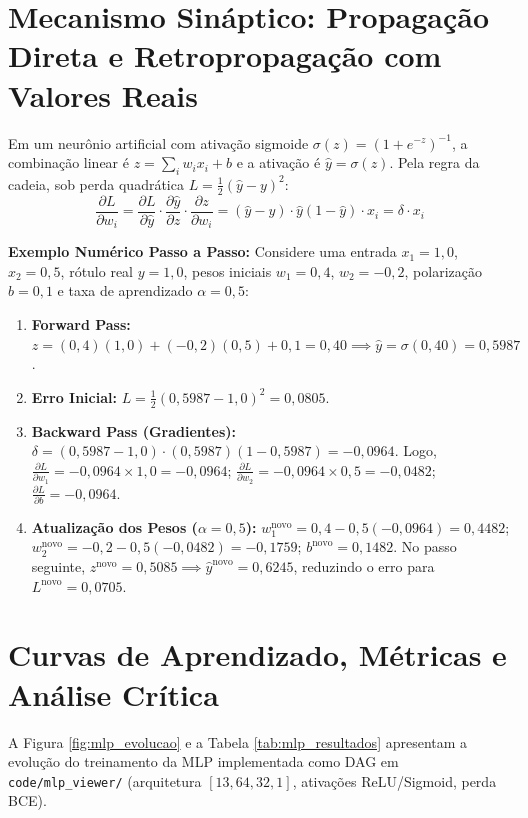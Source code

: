\documentclass[runningheads]{llncs}
\begin{document}
\section{Mecanismo Sináptico: Propagação Direta e Retropropagação com Valores Reais}
Em um neurônio artificial com ativação sigmoide $\sigma(z) = (1 + e^{-z})^{-1}$, a combinação linear é $z = \sum_i w_i x_i + b$ e a ativação é $\hat{y} = \sigma(z)$. Pela regra da cadeia, sob perda quadrática $L = \frac{1}{2}(\hat{y} - y)^2$:
\begin{equation}
\frac{\partial L}{\partial w_i} = \frac{\partial L}{\partial \hat{y}} \cdot \frac{\partial \hat{y}}{\partial z} \cdot \frac{\partial z}{\partial w_i} = (\hat{y} - y)\cdot \hat{y}(1 - \hat{y}) \cdot x_i = \delta \cdot x_i
\end{equation}

\textbf{Exemplo Numérico Passo a Passo:} Considere uma entrada $x_1 = 1{,}0$, $x_2 = 0{,}5$, rótulo real $y = 1{,}0$, pesos iniciais $w_1 = 0{,}4$, $w_2 = -0{,}2$, polarização $b = 0{,}1$ e taxa de aprendizado $\alpha = 0{,}5$:
\begin{enumerate}
    \item \textbf{Forward Pass:} $z = (0{,}4)(1{,}0) + (-0{,}2)(0{,}5) + 0{,}1 = 0{,}40 \implies \hat{y} = \sigma(0{,}40) = 0{,}5987$.
    \item \textbf{Erro Inicial:} $L = \frac{1}{2}(0{,}5987 - 1{,}0)^2 = 0{,}0805$.
    \item \textbf{Backward Pass (Gradientes):} $\delta = (0{,}5987 - 1{,}0)\cdot(0{,}5987)(1 - 0{,}5987) = -0{,}0964$. Logo, $\frac{\partial L}{\partial w_1} = -0{,}0964 \times 1{,}0 = -0{,}0964$; $\frac{\partial L}{\partial w_2} = -0{,}0964 \times 0{,}5 = -0{,}0482$; $\frac{\partial L}{\partial b} = -0{,}0964$.
    \item \textbf{Atualização dos Pesos ($\alpha = 0{,}5$):} $w_1^{\text{novo}} = 0{,}4 - 0{,}5(-0{,}0964) = 0{,}4482$; $w_2^{\text{novo}} = -0{,}2 - 0{,}5(-0{,}0482) = -0{,}1759$; $b^{\text{novo}} = 0{,}1482$. No passo seguinte, $z^{\text{novo}} = 0{,}5085 \implies \hat{y}^{\text{novo}} = 0{,}6245$, reduzindo o erro para $L^{\text{novo}} = 0{,}0705$.
\end{enumerate}

\section{Curvas de Aprendizado, Métricas e Análise Crítica}
A Figura \ref{fig:mlp_evolucao} e a Tabela \ref{tab:mlp_resultados} apresentam a evolução do treinamento da MLP implementada como DAG em \texttt{code/mlp\_viewer/} (arquitetura $[13, 64, 32, 1]$, ativações ReLU/Sigmoid, perda BCE).
\end{document}
